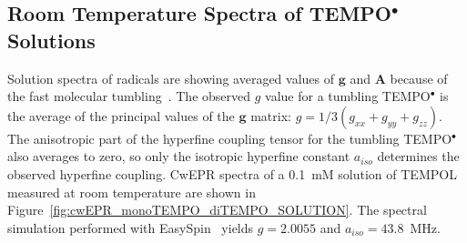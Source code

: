\subsection{Room Temperature Spectra of TEMPO$^{\bullet}$ Solutions}
Solution spectra of radicals are showing averaged values of $\textbf{g}$ and $\textbf{A}$ because of the fast molecular tumbling~\cite{Liu_2008,Carrington_solution_epr}. The observed $g$ value for a tumbling TEMPO$^{\bullet}$ is the average of the principal values of the $\textbf{g}$ matrix: $g = 1/3\left(g_{xx}+g_{yy}+g_{zz}\right)$. The anisotropic part of the hyperfine coupling tensor for the tumbling TEMPO$^{\bullet}$ also averages to zero, so only the isotropic hyperfine constant $a_{iso}$ determines the observed hyperfine coupling. CwEPR spectra of a 0.1~mM solution of TEMPOL measured at room temperature are shown in Figure~\ref{fig:cwEPR_monoTEMPO_diTEMPO_SOLUTION}. The spectral simulation performed with EasySpin~\cite{Stoll2006} yields $g=2.0055$ and $a_{iso}=43.8$~MHz.


